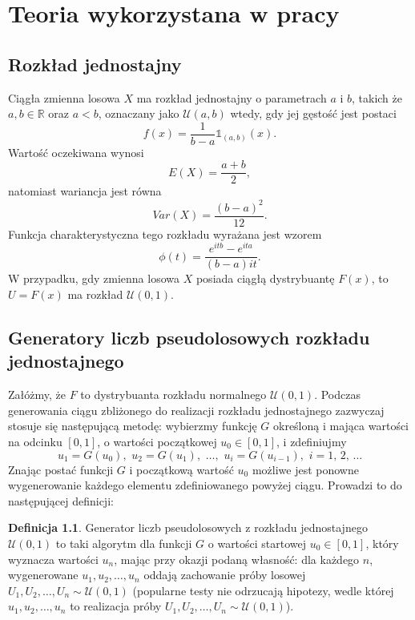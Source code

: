 \documentclass[inzynierska]{pwr_wmat_praca_dyplomowa}
\theoremstyle{plain}
\numberwithin{theorem}{chapter}
\theoremstyle{definition}
\numberwithin{theorem}{chapter}
\newtheorem{definition}[theorem]{Definicja}
\begin{document}
\chapter{Teoria wykorzystana w pracy}

\section{Rozkład jednostajny}
Ciągła zmienna losowa $X$ ma rozkład jednostajny o parametrach $a$ i $b$, takich że $a,b\in \mathds{R}$ oraz $a<b$, oznaczany jako $\mathcal{U}(a,b)$ wtedy, gdy jej gęstość jest postaci
\begin{equation}
f(x)=\frac{1}{b-a}\mathds{1}_{(a,b)}(x).
\end{equation}
Wartość oczekiwana wynosi
\begin{equation}
E(X)=\frac{a+b}{2},
\end{equation}
natomiast wariancja jest równa
\begin{equation}
Var(X)=\frac{(b-a)^2}{12}.
\end{equation} 
Funkcja charakterystyczna tego rozkładu wyrażana jest wzorem
\begin{equation}
\phi(t)=\frac{e^{itb}-e^{ita}}{(b-a)it}.
\end{equation}
W przypadku, gdy zmienna losowa $X$ posiada ciągłą dystrybuantę $F(x)$, to $U=F(x)$ ma rozkład $\mathcal{U}(0,1).$

\section{Generatory liczb pseudolosowych rozkładu jednostajnego} %
Załóżmy, że $F$ to dystrybuanta rozkładu normalnego $\mathcal{U}(0,1)$. Podczas generowania ciągu zbliżonego do realizacji rozkładu jednostajnego zazwyczaj stosuje się następującą metodę: wybierzmy funkcję $G$ określoną i mająca wartości na odcinku $[0,1]$, o wartości początkowej $u_0 \in [0,1]$, i zdefiniujmy
\begin{equation}
	u_1=G(u_0), \,\, u_2=G(u_1), \,\, \dots, \,\,u_i=G(u_{i-1}), \,\, i=1,\,2,\,\dots 
\end{equation}
Znając postać funkcji $G$ i początkową wartość $u_0$ możliwe jest ponowne wygenerowanie każdego elementu zdefiniowanego powyżej ciągu. Prowadzi to do następującej definicji:
\begin{definition}
	Generator liczb pseudolosowych z rozkładu jednostajnego $\mathcal{U}(0,1)$ to taki algorytm dla funkcji $G$ o wartości startowej $u_0 \in [0,1]$, który wyznacza wartości $u_n$, mając przy okazji podaną własność: dla każdego $n$, wygenerowane $u_1,u_2,\dots,u_n$ oddają zachowanie próby losowej $U_1,U_2,\dots,U_n \sim \mathcal{U}(0,1)$ (popularne testy nie odrzucają hipotezy, wedle której $u_1,u_2,\dots,u_n$ to realizacja próby $U_1,U_2,\dots,U_n \sim \mathcal{U}(0,1)$).
\end{definition}
\end{document}
